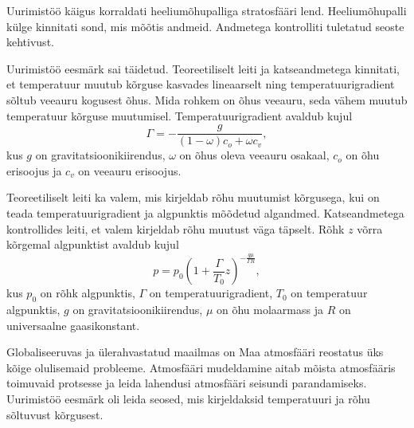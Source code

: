 \documentclass{trkut}%
\begin{document}
Uurimistöö käigus korraldati heeliumõhupalliga stratosfääri lend. Heeliumõhupalli külge kinnitati sond, mis mõõtis andmeid. Andmetega kontrolliti tuletatud seoste kehtivust.

Uurimistöö eesmärk sai täidetud. Teoreetiliselt leiti ja katseandmetega kinnitati, et temperatuur muutub kõrguse kasvades lineaarselt ning temperatuurigradient sõltub veeauru kogusest õhus. Mida rohkem on õhus veeauru, seda vähem muutub temperatuur kõrguse muutumisel. Temperatuurigradient avaldub kujul
\begin{equation*}
	\Gamma = -\frac{g}{(1-\omega)c_{o} + \omega c_{v}} ,
\end{equation*}
kus $g$ on gravitatsioonikiirendus, $\omega$ on õhus oleva veeauru osakaal, $c_o$ on õhu erisoojus ja $c_v$ on veeauru erisoojus.

Teoreetiliselt leiti ka valem, mis kirjeldab rõhu muutumist kõrgusega, kui on teada temperatuurigradient ja algpunktis mõõdetud algandmed. Katseandmetega kontrollides leiti, et valem kirjeldab rõhu muutust väga täpselt. Rõhk $z$ võrra kõrgemal algpunktist avaldub kujul 
\begin{equation*}
	p=p_0 \left(1+\frac{\Gamma}{T_0}z\right)^{ -\frac{g\mu}{\Gamma R}} ,
\end{equation*}
kus $p_0$ on rõhk algpunktis, $\Gamma$ on temperatuurigradient, $T_0$ on temperatuur algpunktis, $g$ on gravitatsioonikiirendus, $\mu$ on õhu molaarmass ja $R$ on universaalne gaasikonstant.




\printbibliography

\scriptsize

\normalsize

\scriptsize

\normalsize

\scriptsize

\normalsize

\scriptsize

\normalsize

%


\kinnitusleht%


Globaliseeruvas ja ülerahvastatud maailmas on Maa atmosfääri reostatus üks kõige olulisemaid probleeme. Atmosfääri mudeldamine aitab mõista atmosfääris toimuvaid protsesse ja leida lahendusi atmosfääri seisundi parandamiseks. Uurimistöö eesmärk oli leida seosed, mis kirjeldaksid temperatuuri ja rõhu sõltuvust kõrgusest.
\end{document}
